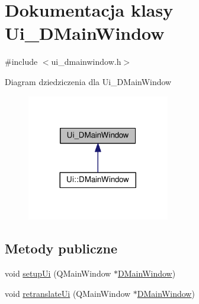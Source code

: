 \hypertarget{class_ui___d_main_window}{\section{Dokumentacja klasy Ui\-\_\-\-D\-Main\-Window}
\label{class_ui___d_main_window}
}


{\ttfamily \#include $<$ui\-\_\-dmainwindow.\-h$>$}



Diagram dziedziczenia dla Ui\-\_\-\-D\-Main\-Window\nopagebreak
\begin{figure}[H]
\begin{center}
\leavevmode
\includegraphics[width=176pt]{class_ui___d_main_window__inherit__graph}
\end{center}
\end{figure}
\subsection*{Metody publiczne}
\begin{DoxyCompactItemize}
\item 
void \hyperlink{class_ui___d_main_window_aa53f3a89bf520704a3e79037df2fd451}{setup\-Ui} (Q\-Main\-Window $\ast$\hyperlink{class_d_main_window}{D\-Main\-Window})
\item 
void \hyperlink{class_ui___d_main_window_a406169c751ddfd205b89375c7542827c}{retranslate\-Ui} (Q\-Main\-Window $\ast$\hyperlink{class_d_main_window}{D\-Main\-Window})
\end{DoxyCompactItemize}
